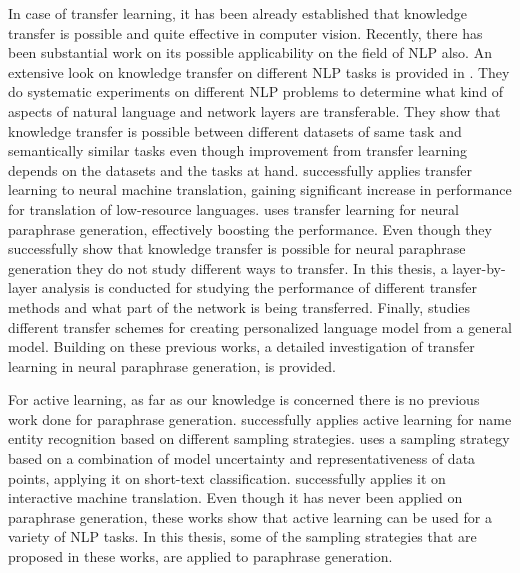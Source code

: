 In case of transfer learning, it has been already established that knowledge transfer is possible and quite effective in computer vision. Recently, there has been substantial work on its possible applicability on the field of NLP also. An extensive look on knowledge transfer on different NLP tasks is provided in \cite{mou}. They do systematic experiments on different NLP problems to determine what kind of aspects of natural language and network layers are transferable. They show that knowledge transfer is possible between different datasets of same task and semantically similar tasks even though improvement from transfer learning depends on the datasets and the tasks at hand. \cite{zoph} successfully applies transfer learning to neural machine translation, gaining significant increase in performance for translation of low-resource languages. \cite{brad} uses transfer learning for neural paraphrase generation, effectively boosting the performance. Even though they successfully show that knowledge transfer is possible for neural paraphrase generation they do not study different ways to transfer. In this thesis, a layer-by-layer analysis is conducted for studying the performance of different transfer methods and what part of the network is being transferred. Finally, \cite{yoon} studies different transfer schemes for creating personalized language model from a general model. Building on these previous works, a detailed investigation of transfer learning in neural paraphrase generation, is provided.

For active learning, as far as our knowledge is concerned there is no previous work done for paraphrase generation. \cite{shen} successfully applies active learning for name entity recognition based on different sampling strategies. \cite{zhao} uses a sampling strategy based on a combination of model uncertainty and representativeness of data points, applying it on short-text classification. \cite{rubio} successfully applies it on interactive machine translation. Even though it has never been applied on paraphrase generation, these works show that active learning can be used for a variety of NLP tasks. In this thesis, some of the sampling strategies that are proposed in these works, are applied to paraphrase generation.